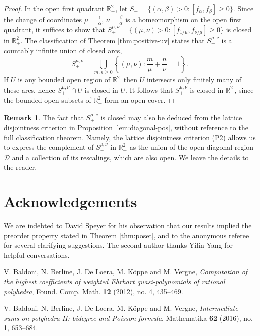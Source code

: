 \documentclass[11pt, letterpaper, reqno]{amsart}
\theoremstyle{definition}
\newtheorem{rmk}[thm]{Remark}
\numberwithin{equation}{section}
\newcommand{\RR}{\ensuremath{\mathbb{R}}}
\newcommand{\um}{{\mu}}
\newcommand{\vm}{{\nu}}
\newcommand{\cD}{\mathcal{D}}
\begin{document}
{\begin{proof}
In the open first quadrant $\RR^2_{+}$, let $S_{+} = \{(\alpha,\beta) > 0 :  [f_\alpha,f_\beta]\geq 0\}$.
Since the change of coordinates $\um = \frac{1}{\alpha}$, $\vm = \frac{\beta}{\alpha}$ is 
a homeomorphism on the open first quadrant, 
it suffices to show that $ { S_{+}^{\um,\vm}= \{ {(\um,\vm) > 0} :   [f_{1/\um},f_{\vm/\um}] \geq 0\} }$
is closed in $\RR_{+}^2$. %
The classification of Theorem \ref{thm:positive-uv} states that $S_{+}^{\um,\vm}$ is a 
countably infinite union of closed arcs,
\[ S_{+}^{\um,\vm} = \bigcup_{m,n\geq 0}\left\{ (\um,\vm) : \frac{m}{\um} + \frac{n}{\vm} = 1 \right\} .\]
If $U$ is any bounded open region of $\RR^2_{+}$ then $U$ intersects only finitely many of these arcs,
hence $S_{+}^{\um,\vm} \cap U$ is closed in $U$.
It follows that  $S_{+}^{\um,\vm}$ is closed in $\RR^2_{+}$, 
since the bounded open subsets of $\RR^2_{+}$ form an open cover.
\end{proof}

\begin{rmk}
The fact that $S_{+}^{\um,\vm}$ is closed may also be deduced from
the lattice disjointness criterion in Proposition \ref{lem:diagonal-pos},
without reference to the full classification theorem.
Namely, the lattice disjointness criterion (P2) allows us to express the complement 
of $S_{+}^{\um,\vm}$ in $\RR_{+}^2$ as the union of the open diagonal region $\cD$ and 
a collection of its rescalings, which are also open.
We leave the details to the reader.
\end{rmk}


\section*{Acknowledgements}
We are indebted to David Speyer for his observation that our results implied the
preorder property  stated in  Theorem \ref{thm:poset},
and to the anonymous referee for several clarifying suggestions.
The second author thanks  Yilin Yang for helpful conversations.


\begin{thebibliography}{99}
V. Baldoni, N. Berline, J. De Loera, M. K\"{o}ppe and M. Vergne,
\emph{Computation of the highest coefficients of weighted Ehrhart quasi-polynomials
of rational polyhedra},
Found. Comp. Math. {\bf 12} (2012), no. 4, 435--469.

V. Baldoni, N. Berline, J. De Loera, M. K\"{o}ppe and M. Vergne,
\emph{Intermediate sums on polyhedra II: bidegree and Poisson formula},
Mathematika {\bf 62} (2016), no. 1, 653--684.


\end{thebibliography}}
\end{document}
